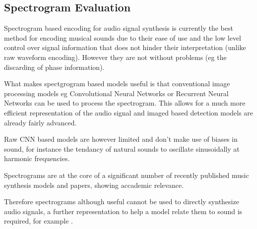 \subsection{Spectrogram Evaluation}

Spectrogram based encoding for audio signal synthesis is currently the best method for encoding musical sounds due to their ease of use and the low level  control over signal information that does not hinder their interpretation (unlike raw waveform encoding). However they are not without problems (eg the discarding of phase information).

What makes spectgrogram based models useful is that conventional image processing models eg Convolutional Neural Networks or Recurrent Neural Networks can be used to process the spectrogram. This allows for a much more efficient representation of the audio signal and imaged based detection models are already fairly advanced.

Raw CNN based models are however limited and don't make use of biases in sound, for instance the tendancy of natural sounds to oscillate sinusoidally at harmonic frequencies.

Spectrograms are at the core of a significant number of recently published music synthesis models and papers, showing accademic relevance.

Therefore spectrograms although useful cannot be used to directly synthesize audio signals, a further representation to help a model relate them to sound is required, for example .